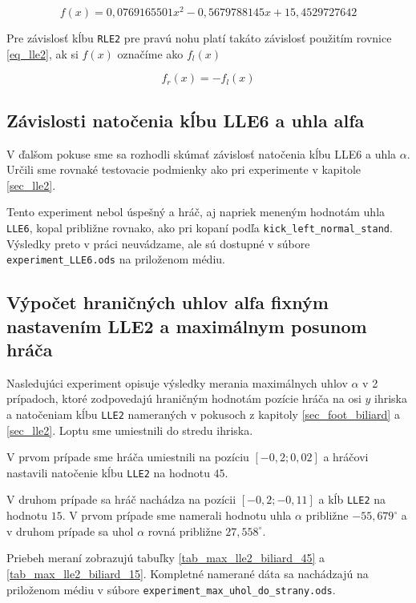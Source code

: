 \begin{equation} \label{eq_lle2}
	f(x) = 0,0769165501x^2 - 0,5679788145x + 15,4529727642
\end{equation}

Pre závislosť kĺbu \texttt{RLE2} pre pravú nohu platí takáto závislosť použitím rovnice \ref{eq_lle2}, ak si $f(x)$ označíme ako $f_l(x)$

\begin{equation} \label{eq_rle2}
	f_r(x) = -f_l(x)
\end{equation}

\subsection{Závislosti natočenia kĺbu LLE6 a uhla alfa}

V ďalšom pokuse sme sa rozhodli skúmať závislosť natočenia kĺbu LLE6 a uhla $\alpha$. Určili sme rovnaké testovacie podmienky ako pri experimente v kapitole \ref{sec_lle2}.

Tento experiment nebol úspešný a hráč, aj napriek meneným hodnotám uhla \texttt{LLE6}, kopal približne rovnako, ako pri kopaní podľa \texttt{kick\_left\_normal\_stand}. Výsledky preto v práci neuvádzame, ale sú dostupné v súbore \newline\texttt{experiment\_LLE6.ods} na priloženom médiu.

\subsection{Výpočet hraničných uhlov alfa fixným nastavením LLE2 a maximálnym posunom hráča} \label{sec_max_fixed_joints}

Nasledujúci experiment opisuje výsledky merania maximálnych uhlov $\alpha$ v 2 prípadoch, ktoré zodpovedajú hraničným hodnotám pozície hráča na osi $y$ ihriska a natočeniam kĺbu \texttt{LLE2} nameraných v pokusoch z kapitoly \ref{sec_foot_biliard} a \ref{sec_lle2}. Loptu sme umiestnili do stredu ihriska. 

V prvom prípade sme hráča umiestnili na pozíciu $[-0,2; 0,02]$ a hráčovi nastavili natočenie kĺbu \texttt{LLE2} na hodnotu $45$. 

V druhom prípade sa hráč nachádza na pozícii $[-0,2; -0,11]$ a kĺb \texttt{LLE2} na hodnotu $15$. V prvom prípade sme namerali hodnotu uhla $\alpha$ približne $-55,679^{\circ}$ a v druhom prípade sa uhol $\alpha$ rovná približne $27,558^{\circ}$. 

Priebeh meraní zobrazujú tabuľky \ref{tab_max_lle2_biliard_45} a \ref{tab_max_lle2_biliard_15}. Kompletné namerané dáta sa nachádzajú na priloženom médiu v súbore \newline\texttt{experiment\_max\_uhol\_do\_strany.ods}.

